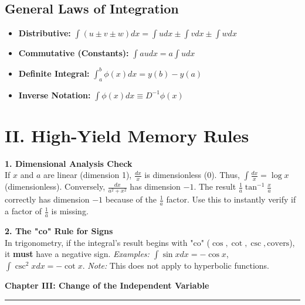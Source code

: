 \documentclass[11pt, a4paper]{article}
\begin{document}
\vspace{0.3cm}

\subsection*{\color{secondary} General Laws of Integration}
\begin{itemize}[leftmargin=*, nosep]
    \item \textbf{\color{accent}Distributive:} $\int (u \pm v \pm w) dx = \int u dx \pm \int v dx \pm \int w dx$
    \item \textbf{\color{accent}Commutative (Constants):} $\int a u dx = a \int u dx$
    \item \textbf{\color{accent}Definite Integral:} $\int_a^b \phi(x) dx = y(b) - y(a)$
    \item \textbf{\color{accent}Inverse Notation:} $\int \phi(x) dx \equiv D^{-1}\phi(x)$
\end{itemize}


\section*{\color{primary} II. High-Yield Memory Rules}

\textbf{1. Dimensional Analysis Check}\\
If $x$ and $a$ are linear (dimension 1), $\frac{dx}{x}$ is dimensionless (0). Thus, $\int \frac{dx}{x} = \log x$ (dimensionless). Conversely, $\frac{dx}{a^2+x^2}$ has dimension $-1$. The result $\frac{1}{a}\tan^{-1}\frac{x}{a}$ correctly has dimension $-1$ because of the $\frac{1}{a}$ factor. Use this to instantly verify if a factor of $\frac{1}{a}$ is missing.

\textbf{2. The "co" Rule for Signs}\\
In trigonometry, if the integral's result begins with "co" ($\cos, \cot, \csc, \text{covers}$), it \textbf{must} have a negative sign. 
\textit{Examples:} $\int \sin x dx = -\cos x$, $\int \csc^2 x dx = -\cot x$. 
\textit{Note:} This does not apply to hyperbolic functions.

\newpage

\begin{center}
    {\LARGE \bfseries \color{accent} Chapter III: Change of the Independent Variable}\\
    \vspace{0.2cm}
    {\color{accent}\rule{0.55\linewidth}{0.8pt}}
\end{center}
\vspace{0.35cm}
\end{document}
